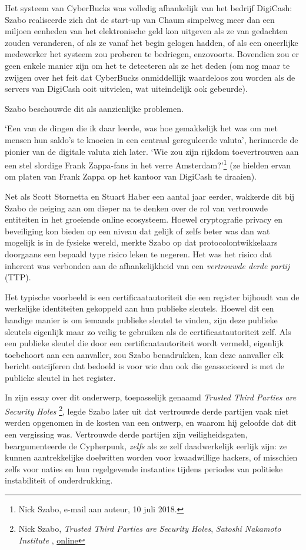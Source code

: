 \documentclass[
  a5paper,
  smalldemyvopaper,11pt,twoside,onecolumn,openright,extrafontsizes,
hidelinks]{memoir}
\begin{document}
Het systeem van CyberBucks was volledig afhankelijk van het bedrijf
DigiCash: Szabo realiseerde zich dat de start-up van Chaum simpelweg
meer dan een miljoen eenheden van het elektronische geld kon uitgeven
als ze van gedachten zouden veranderen, of als ze vanaf het begin
gelogen hadden, of als een oneerlijke medewerker het systeem zou
proberen te bedriegen, enzovoorts. Bovendien zou er geen enkele manier
zijn om het te detecteren als ze het deden (om nog maar te zwijgen over
het feit dat CyberBucks onmiddellijk waardeloos zou worden als de
servers van DigiCash ooit uitvielen, wat uiteindelijk ook gebeurde).

Szabo beschouwde dit als aanzienlijke problemen.

`Een van de dingen die ik daar leerde, was hoe gemakkelijk het was om
met mensen hun saldo's te knoeien in een centraal gereguleerde valuta',
herinnerde de pionier van de digitale valuta zich later. `Wie zou zijn
rijkdom toevertrouwen aan een stel slordige Frank Zappa-fans in het
verre Amsterdam?'\footnote{Nick Szabo, e-mail aan auteur, 10 juli 2018.}
(ze hielden ervan om platen van Frank Zappa op het kantoor van DigiCash
te draaien).

Net als Scott Stornetta en Stuart Haber een aantal jaar eerder, wakkerde
dit bij Szabo de neiging aan om dieper na te denken over de rol van
vertrouwde entiteiten in het groeiende online ecosysteem. Hoewel
cryptografie privacy en beveiliging kon bieden op een niveau dat gelijk
of zelfs beter was dan wat mogelijk is in de fysieke wereld, merkte
Szabo op dat protocolontwikkelaars doorgaans een bepaald type risico
leken te negeren. Het was het risico dat inherent was verbonden aan de
afhankelijkheid van een \emph{vertrouwde derde partij} (TTP).

Het typische voorbeeld is een certificaatautoriteit die een register
bijhoudt van de werkelijke identiteiten gekoppeld aan hun publieke
sleutels. Hoewel dit een handige manier is om iemands publieke sleutel
te vinden, zijn deze publieke sleutels eigenlijk maar zo veilig te
gebruiken als de certificaatautoriteit zelf. Als een publieke sleutel
die door een certificaatautoriteit wordt vermeld, eigenlijk toebehoort
aan een aanvaller, zou Szabo benadrukken, kan deze aanvaller elk bericht
ontcijferen dat bedoeld is voor wie dan ook die geassocieerd is met de
publieke sleutel in het register.

In zijn essay over dit onderwerp, toepasselijk genaamd \emph{Trusted
Third Parties are Security Holes} \footnote{Nick Szabo, \emph{Trusted
  Third Parties are Security Holes}, \emph{Satoshi Nakamoto Institute} ,
  \href{https://nakamotoinstitute.org/library/trusted-third-parties/}{online}},
legde Szabo later uit dat vertrouwde derde partijen vaak niet werden
opgenomen in de kosten van een ontwerp, en waarom hij geloofde dat dit
een vergissing was. Vertrouwde derde partijen zijn veiligheidsgaten,
beargumenteerde de Cypherpunk, \emph{zelfs} als ze zelf daadwerkelijk
eerlijk zijn: ze kunnen aantrekkelijke doelwitten worden voor
kwaadwillige hackers, of misschien zelfs voor naties en hun regelgevende
instanties tijdens periodes van politieke instabiliteit of
onderdrukking.
\end{document}
